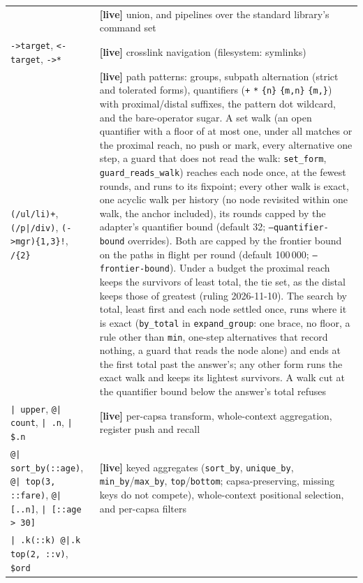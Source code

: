 \documentclass{report}
\newcommand{\live}{\textbf{\textcolor{blue!60!black}{[live]}}\xspace}
\begin{document}
\begin{xltabular}{\textwidth}{>{\raggedright\arraybackslash}p{0.36\textwidth} X}
  & \live union, and pipelines over the standard library's command set \\
\texttt{->target}, \texttt{<-target}, \texttt{->*}
  & \live crosslink navigation (filesystem: symlinks) \\
\texttt{(/ul/li)+}, \texttt{(/p|/div)}, \texttt{(->mgr)\{1,3\}!},
\texttt{/\{2\}}
  & \live path patterns: groups, subpath alternation (strict and
    tolerated forms), quantifiers (\texttt{+} \texttt{*}
    \texttt{\{n\}} \texttt{\{m,n\}} \texttt{\{m,\}}) with
    proximal/distal suffixes, the pattern dot wildcard, and the
    bare-operator sugar. A set walk (an open quantifier with a
    floor of at most one, under all matches or the proximal reach,
    no push or mark, every alternative one step, a guard that does
    not read the walk: \texttt{set\_form},
    \texttt{guard\_reads\_walk}) reaches each node once, at the
    fewest rounds, and runs to its fixpoint; every other walk is
    exact, one acyclic walk per history (no node revisited within
    one walk, the anchor included), its rounds capped by the
    adapter's quantifier bound (default 32;
    \texttt{--quantifier-bound} overrides). Both are capped by the
    frontier bound on the paths in flight per round (default
    100\,000; \texttt{--frontier-bound}). Under a budget the
    proximal reach keeps the survivors of least total, the tie set,
    as the distal keeps those of greatest (ruling 2026-11-10). The
    search by total, least first and each node settled once, runs
    where it is exact (\texttt{by\_total} in
    \texttt{expand\_group}: one brace, no floor, a rule other than
    \texttt{min}, one-step alternatives that record nothing, a
    guard that reads the node alone) and ends at the first total
    past the answer's; any other form runs the exact walk and keeps
    its lightest survivors. A walk cut at the quantifier bound below
    the answer's total refuses \\
\texttt{| upper}, \texttt{@| count}, \texttt{| .n}, \texttt{| \$.n}
  & \live per-capsa transform, whole-context aggregation, register
    push and recall \\
\texttt{@| sort\_by(::age)}, \texttt{@| top(3, ::fare)},
\texttt{@| [..n]}, \texttt{| [::age > 30]}
  & \live keyed aggregates (\texttt{sort\_by}, \texttt{unique\_by},
    \texttt{min\_by}/\texttt{max\_by}, \texttt{top}/\texttt{bottom};
    capsa-preserving, missing keys do not compete), whole-context
    positional selection, and per-capsa filters \\
\texttt{| .k(::k) @|{.k} top(2, ::v)}, \texttt{\$ord}

\end{xltabular}
\end{document}
